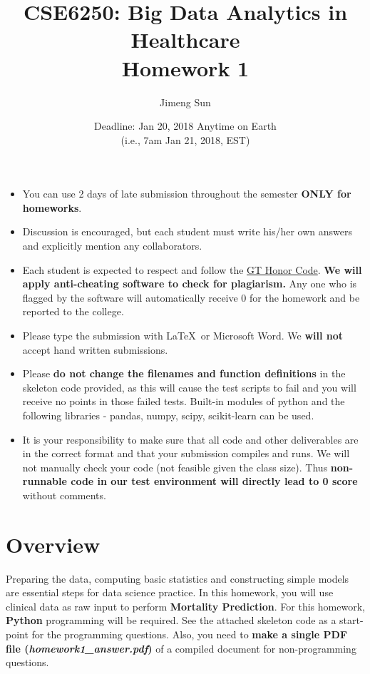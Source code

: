 \documentclass[12pt]{article}
\title{CSE6250: Big Data Analytics in Healthcare \\ Homework 1}
\author{Jimeng Sun}
\date{Deadline: Jan 20, 2018 Anytime on Earth\\ (i.e., 7am Jan 21, 2018, EST)}
\begin{document}
\maketitle
\begin{itemize}
\item You can use 2 days of late submission throughout the semester \textbf{ONLY for homeworks}.
\item Discussion is encouraged, but each student must write his/her own answers and explicitly mention any collaborators.
\item Each student is expected to respect and follow the \href{http://www.honor.gatech.edu/}{ GT Honor Code}. \textbf{We will apply anti-cheating software to check for plagiarism.} Any one who is flagged by the software will automatically receive 0 for the homework and be reported to the college.
\item Please type the submission with \LaTeX\ or Microsoft Word. We \textbf{will not} accept hand written submissions.
\item Please \textbf{do not change the filenames and function definitions} in the skeleton code provided, as this will cause the test scripts to fail and you will  receive no points in those failed tests. Built-in modules of python and the following libraries -  pandas, numpy, scipy, scikit-learn can be used. 
\item It is your responsibility to make sure that all code and other deliverables are in the correct format and that your submission compiles and runs. We will not manually check your code (not feasible given the class size). Thus \textbf{non-runnable code in our test environment will directly lead to 0 score} without comments.
\end{itemize}

\section*{Overview}

Preparing the data, computing basic statistics and constructing simple models are essential steps for  data science practice. In this homework, you will use clinical data as raw input to perform \textbf{Mortality Prediction}. For this homework, \textbf{Python} programming will be required. See the attached skeleton code as a start-point for the programming questions. Also, you need to \textbf{make a single PDF file (\textit{homework1\_answer.pdf}) }of a compiled document for non-programming questions.
\end{document}
